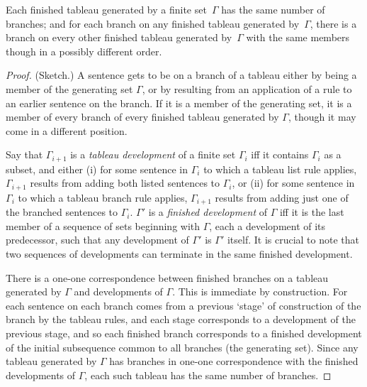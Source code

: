\begin{lemma}\label{obm}
	Each finished tableau generated by a finite set\, $\Gamma$ has the same number of branches; and for each branch on any finished tableau generated by\, $\Gamma$, there is a branch on every other finished tableau generated by\, $\Gamma$ with the same members though in a possibly different order.
	\begin{proof}
	 	(Sketch.) A sentence gets to be on a branch of a tableau either by being a member of the generating set $\Gamma$, or by resulting from an application of a rule to an earlier sentence on the branch. If it is a member of the generating set, it is a member of every branch of every finished tableau generated by $\Gamma$, though it may come in a different position.



Say that $\Gamma_{i+1}$ is a \emph{tableau development} of a finite set $\Gamma_{i}$ iff it contains $\Gamma_{i}$ as a subset, and either (i) for some sentence in $\Gamma_{i}$ to which a tableau list rule applies, $\Gamma_{i+1}$ results from adding both listed sentences to $\Gamma_{i}$, or (ii) for some sentence in $\Gamma_{i}$ to which a tableau branch rule applies, $\Gamma_{i+1}$ results from adding just one of the branched sentences to $\Gamma_{i}$. $\Gamma'$ is a \emph{finished development} of $\Gamma$ iff it is the last member of a sequence of sets beginning with $\Gamma$, each a development of its predecessor, such that any development of $\Gamma'$ is $\Gamma'$ itself. It is crucial to note that two sequences of developments can terminate in the same finished development.

There is a one-one correspondence between finished branches on a tableau generated by $\Gamma$ and developments of $\Gamma$. This is immediate by construction. For each sentence on each branch comes from a previous `stage' of construction of the branch by the tableau rules, and each stage corresponds to a development of the previous stage, and so each finished branch corresponds to a finished development of the initial subsequence common to all branches (the generating set). Since any tableau generated by $\Gamma$ has branches in one-one correspondence with the finished developments of $\Gamma$, each such tableau has the same number of branches. 


\end{proof}
\end{lemma}
